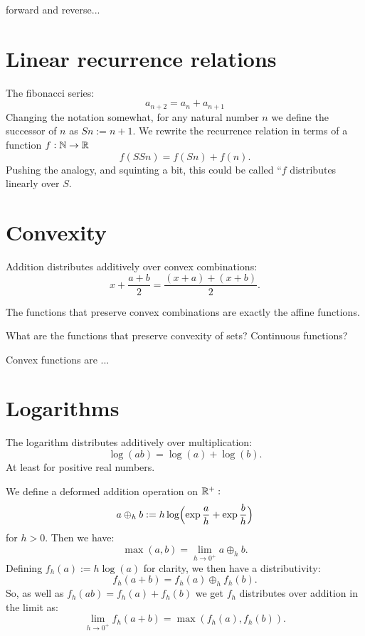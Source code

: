 \documentclass[11pt]{article}
\begin{document}
forward and reverse...

%

%
%

\section{Linear recurrence relations}

The fibonacci series:
$$
    a_{n+2} = a_n + a_{n+1}
$$
Changing the notation somewhat, for any natural number $n$
we define the successor of $n$ as $Sn := n+1.$
We rewrite the recurrence relation in terms of a function $f:\mathbb N\to\mathbb R$
$$
    f(SSn) = f(Sn) + f(n).
$$
Pushing the analogy, and squinting a bit, this
could be called ``$f$ distributes linearly over $S.$

%
%

\section{Convexity}

Addition distributes additively over convex
combinations:
$$
x + \frac{a+b}{2} = \frac{(x+a) + (x+b)}{2}.
$$

The functions that preserve convex combinations
are exactly the affine functions.

What are the functions that preserve convexity of sets? Continuous functions?

Convex functions are ...

%
%

\section{Logarithms}

The logarithm distributes additively over multiplication: 
$$\log(ab) = \log(a) + \log(b).$$
At least for positive real numbers.

We define a deformed addition operation on $\mathbb R^{+}:$
$$
    a\oplus_h b := h\log \Bigl( \exp\frac{a}{h} +\exp\frac{b}{h} \Bigr)
$$
for $h>0.$
Then we have:
$$
    \max(a, b) = \lim_{h\to 0^+} a\oplus_h b.
$$
Defining $f_h(a) := h\log(a)$ for clarity, we then
have a distributivity:
$$
    f_h(a+b) = f_h(a) \oplus_h f_h(b).
$$
So, as well as $f_h(ab) = f_h(a) + f_h(b)$ we
get $f_h$ distributes over addition in the limit as:
$$
    \lim_{h\to 0^+} f_h(a+b) = \max(f_h(a), f_h(b)).
$$
\end{document}
